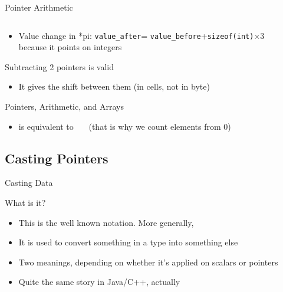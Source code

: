 \begin{Coupe}
\begin{frame}{Pointer Arithmetic}
\begin{columns}
\begin{column}{.55\linewidth}
    \end{column}    
  \end{columns}
  \begin{itemize}
  \item Value change in *pi:  \texttt{value\_after}= \texttt{value\_before}+\texttt{sizeof(int)}$\times3$\\
    because it points on integers
  \end{itemize}
  \begin{block}{Subtracting 2 pointers is valid} 
    \begin{itemize}
    \item It gives the shift between them (in cells, not in byte)
    \end{itemize}
  \end{block}


  \begin{block}{Pointers, Arithmetic, and Arrays}
    \begin{itemize}
    \item {} is equivalent to 
      ~~~(that is why we count elements from 0)
    \end{itemize}
  \end{block}
\end{frame}
\subsection{Casting Pointers}\subtoc
\begin{frame}{Casting Data}
  \vspace{-.5\baselineskip}
  \begin{block}{What is it?}
    \begin{itemize}\vspace{-.2\baselineskip}
    \item This is the well known  notation. More generally, 
    \item It is used to convert something in a type into something else
    \item Two meanings, depending on whether it's applied on scalars or
      pointers
    \item Quite the same story in Java/C++, actually
    \end{itemize}
  \end{block}\vspace{-.5\baselineskip}


\end{frame}
\end{Coupe}
